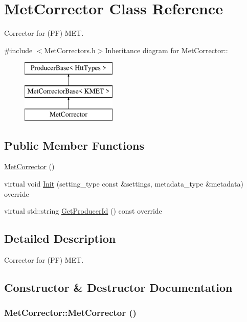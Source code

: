 \hypertarget{classMetCorrector}{
\section{MetCorrector Class Reference}
\label{classMetCorrector}
}


Corrector for (PF) MET.  


{\ttfamily \#include $<$MetCorrectors.h$>$}Inheritance diagram for MetCorrector::\begin{figure}[H]
\begin{center}
\leavevmode
\includegraphics[height=3cm]{classMetCorrector}
\end{center}
\end{figure}
\subsection*{Public Member Functions}
\begin{DoxyCompactItemize}
\item 
\hyperlink{classMetCorrector_a8ec4144ce4dadeb9b5bad31a0a52b8c6}{MetCorrector} ()
\item 
virtual void \hyperlink{classMetCorrector_a6ee5bc3ba9731e73c395057f47e86f67}{Init} (setting\_\-type const \&settings, metadata\_\-type \&metadata) override
\item 
virtual std::string \hyperlink{classMetCorrector_a54cdd5649b20081da2e3121a97b7d597}{GetProducerId} () const override
\end{DoxyCompactItemize}


\subsection{Detailed Description}
Corrector for (PF) MET. 

\subsection{Constructor \& Destructor Documentation}
\hypertarget{classMetCorrector_a8ec4144ce4dadeb9b5bad31a0a52b8c6}{
\subsubsection[{MetCorrector}]{\setlength{\rightskip}{0pt plus 5cm}MetCorrector::MetCorrector ()}}
\label{classMetCorrector_a8ec4144ce4dadeb9b5bad31a0a52b8c6}


